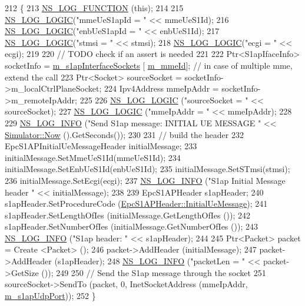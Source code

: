 \begin{DoxyCode}
212 \{
213   \hyperlink{log-macros-disabled_8h_a90b90d5bad1f39cb1b64923ea94c0761}{NS\_LOG\_FUNCTION} (\textcolor{keyword}{this});
214 
215   \hyperlink{group__logging_ga88acd260151caf2db9c0fc84997f45ce}{NS\_LOG\_LOGIC}(\textcolor{stringliteral}{"mmeUeS1apId = "} << mmeUeS1Id);
216   \hyperlink{group__logging_ga88acd260151caf2db9c0fc84997f45ce}{NS\_LOG\_LOGIC}(\textcolor{stringliteral}{"enbUeS1apId = "} << enbUeS1Id);
217   \hyperlink{group__logging_ga88acd260151caf2db9c0fc84997f45ce}{NS\_LOG\_LOGIC}(\textcolor{stringliteral}{"stmsi = "} << stmsi);
218   \hyperlink{group__logging_ga88acd260151caf2db9c0fc84997f45ce}{NS\_LOG\_LOGIC}(\textcolor{stringliteral}{"ecgi = "} << ecgi);
219 
220   \textcolor{comment}{// TODO check if an assert is needed}
221 
222   Ptr<S1apIfaceInfo> socketInfo = \hyperlink{classns3_1_1EpcS1apEnb_ad91b3139b21bd084edf401249d4e4233}{m\_s1apInterfaceSockets} [
      \hyperlink{classns3_1_1EpcS1apEnb_a44a703502c1439b86664b12751b15d69}{m\_mmeId}]; \textcolor{comment}{// in case of multiple mme, extend the call}
223   Ptr<Socket> sourceSocket = socketInfo->m\_localCtrlPlaneSocket;
224   Ipv4Address mmeIpAddr = socketInfo->m\_remoteIpAddr;
225 
226   \hyperlink{group__logging_ga88acd260151caf2db9c0fc84997f45ce}{NS\_LOG\_LOGIC} (\textcolor{stringliteral}{"sourceSocket = "} << sourceSocket);
227   \hyperlink{group__logging_ga88acd260151caf2db9c0fc84997f45ce}{NS\_LOG\_LOGIC} (\textcolor{stringliteral}{"mmeIpAddr = "} << mmeIpAddr);
228 
229   \hyperlink{group__logging_gafbd73ee2cf9f26b319f49086d8e860fb}{NS\_LOG\_INFO} (\textcolor{stringliteral}{"Send S1ap message: INITIAL UE MESSAGE "} << 
      \hyperlink{classns3_1_1Simulator_ac3178fa975b419f7875e7105be122800}{Simulator::Now} ().GetSeconds());
230 
231   \textcolor{comment}{// build the header}
232   EpcS1APInitialUeMessageHeader initialMessage;
233   initialMessage.SetMmeUeS1Id(mmeUeS1Id);
234   initialMessage.SetEnbUeS1Id(enbUeS1Id);
235   initialMessage.SetSTmsi(stmsi);
236   initialMessage.SetEcgi(ecgi);
237   \hyperlink{group__logging_gafbd73ee2cf9f26b319f49086d8e860fb}{NS\_LOG\_INFO} (\textcolor{stringliteral}{"S1ap Initial Message header "} << initialMessage);
238 
239   EpcS1APHeader s1apHeader;
240   s1apHeader.SetProcedureCode (\hyperlink{classns3_1_1EpcS1APHeader_aedd7ba8568bf04ce8960bd840712a63eaf6e59a9d987f46fb18f5113370354521}{EpcS1APHeader::InitialUeMessage});
241   s1apHeader.SetLengthOfIes (initialMessage.GetLengthOfIes ());
242   s1apHeader.SetNumberOfIes (initialMessage.GetNumberOfIes ());
243   \hyperlink{group__logging_gafbd73ee2cf9f26b319f49086d8e860fb}{NS\_LOG\_INFO} (\textcolor{stringliteral}{"S1ap header: "} << s1apHeader);
244 
245   Ptr<Packet> packet = Create <Packet> ();
246   packet->AddHeader (initialMessage);
247   packet->AddHeader (s1apHeader);
248   \hyperlink{group__logging_gafbd73ee2cf9f26b319f49086d8e860fb}{NS\_LOG\_INFO} (\textcolor{stringliteral}{"packetLen = "} << packet->GetSize ());
249 
250   \textcolor{comment}{// Send the S1ap message through the socket}
251   sourceSocket->SendTo (packet, 0, InetSocketAddress (mmeIpAddr, \hyperlink{classns3_1_1EpcS1apEnb_ae06c681ae6a91dc4729408d0a7b4dd39}{m\_s1apUdpPort}));
252 \}
\end{DoxyCode}


